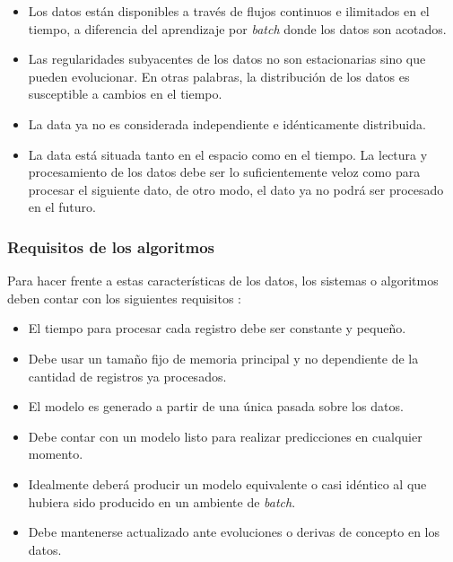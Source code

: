 \begin{itemize} 

   \item Los datos están disponibles a través de flujos continuos e ilimitados
      en el tiempo, a diferencia del aprendizaje por \textit{batch} donde los
      datos son acotados.

   \item Las regularidades subyacentes de los datos no son estacionarias sino
      que pueden evolucionar. En otras palabras, la distribución de los datos es
      susceptible a cambios en el tiempo.

   \item La data ya no es considerada independiente e idénticamente distribuida.

   \item La data está situada tanto en el espacio como en el tiempo. La lectura
      y procesamiento de los datos debe ser lo suficientemente veloz como para
      procesar el siguiente dato, de otro modo, el dato ya no podrá ser procesado
      en el futuro.

\end{itemize}

\subsubsection{Requisitos de los algoritmos}
\label{stream_requisitos}

Para hacer frente a estas características de los datos, los sistemas o
algoritmos deben contar con los siguientes requisitos \cite{hulten_mining_2001}: 

\begin{itemize} 

   \item El tiempo para procesar cada registro debe ser constante y pequeño. 

   \item Debe usar un tamaño fijo de memoria principal y no dependiente de la
      cantidad de registros ya procesados. 

   \item El modelo es generado a partir de una única pasada sobre los datos. 

   \item Debe contar con un modelo listo para realizar predicciones en cualquier
      momento.  

   \item Idealmente deberá producir un modelo equivalente o casi idéntico al que
      hubiera sido producido en un ambiente de \textit{batch}.

   \item Debe mantenerse actualizado ante evoluciones o derivas de concepto en
      los datos.  

\end{itemize}

